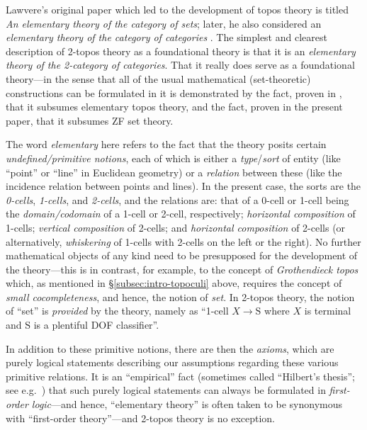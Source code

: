 \documentclass{amsart}
\newcommand\rS{\mathrm{S}}
\newcommand\prerefpost[3]{%
  \texorpdfstring%
    {\hyperref[#2]{#1\ref*{#2}#3}}%
    {#1\ref*{#2}#3}%
}
\newcommand\sref[1]{\prerefpost{\S}{#1}{}}
\theoremstyle{definition}
\theoremstyle{remark}
\theoremstyle{plainwithref}
\begin{document}
Lawvere's original paper \cite{lawvere-etcs} which led to the development of topos theory is titled \emph{An elementary theory of the category of sets}; later, he also considered an \emph{elementary theory of the category of categories} \cite{lawvere-cat-of-cats}.
The simplest and clearest description of 2-topos theory as a foundational theory is that it is an \emph{elementary theory of the 2-category of categories}.
That it really does serve as a foundational theory---in the sense that all of the usual mathematical (set-theoretic) constructions can be formulated in it is demonstrated by the fact, proven in \cite{helfer-topoi-in-topoi}, that it subsumes elementary topos theory, and the fact, proven in the present paper, that it subsumes ZF set theory.

The word \emph{elementary} here refers to the fact that the theory posits certain \emph{undefined/primitive notions}, each of which is either a \emph{type}/\emph{sort} of entity (like ``point'' or ``line'' in Euclidean geometry) or a \emph{relation} between these (like the incidence relation between points and lines).
In the present case, the sorts are the \emph{0-cells}, \emph{1-cells}, and \emph{2-cells}, and the relations are: that of a 0-cell or 1-cell being the \emph{domain/codomain} of a 1-cell or 2-cell, respectively; \emph{horizontal composition} of 1-cells; \emph{vertical composition} of 2-cells; and \emph{horizontal composition} of 2-cells (or alternatively, \emph{whiskering} of 1-cells with 2-cells on the left or the right).
No further mathematical objects of any kind need to be presupposed for the development of the theory---this is in contrast, for example, to the concept of \emph{Grothendieck topos} which, as mentioned in \sref{subsec:intro-topoculi} above, requires the concept of \emph{small cocompleteness}, and hence, the notion of \emph{set}.
In 2-topos theory, the notion of ``set'' is \emph{provided} by the theory, namely as ``1-cell \( X \to \rS \) where \( X \) is terminal and \( \rS \) is a plentiful DOF classifier''.

In addition to these primitive notions, there are then the \emph{axioms}, which are purely logical statements describing our assumptions regarding these various primitive relations.
It is an ``empirical'' fact (sometimes called ``Hilbert's thesis''; see e.g.\ \cite[\S A.1.5]{barwise-handbook}) that such purely logical statements can always be formulated in \emph{first-order logic}---and hence, ``elementary theory'' is often taken to be synonymous with ``first-order theory''---and 2-topos theory is no exception.
\end{document}
